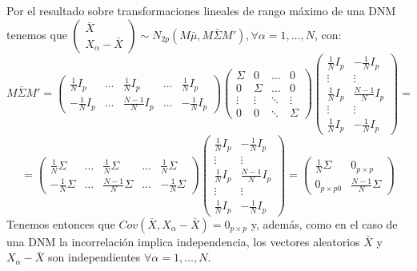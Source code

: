 \documentclass[11pt,a4paper]{article}
\begin{document}
\begin{enumerate}[label=\arabic*.]
\begin{enumerate}[label=(\alph*)]
Por el resultado sobre transformaciones lineales de rango máximo de una DNM tenemos que $\begin{pmatrix} \bar{X} \\ X_{\alpha}-\bar{X} \end{pmatrix} \sim N_{2p}(M\bar{\mu}, M\bar{\Sigma}M'), \forall \alpha = 1, \dots, N$, con:
$$M\bar{\Sigma}M' = \begin{pmatrix}
\frac{1}{N} I_{p} & \dots & \frac{1}{N}I_{p} & \dots & \frac{1}{N}I_{p} \\
-\frac{1}{N}I_{p} & \dots & \frac{N-1}{N}I_{p} & \dots & -\frac{1}{N}I_{p}
\end{pmatrix} \begin{pmatrix}
\Sigma & 0 & \dots & 0 \\
0 & \Sigma & \dots & 0 \\
\vdots & \vdots & \ddots & \vdots \\
0 & 0 & \ddots & \Sigma
\end{pmatrix} \begin{pmatrix}
\frac{1}{N} I_{p} & -\frac{1}{N}I_{p} \\
\vdots & \vdots \\
\frac{1}{N}I_{p} & \frac{N-1}{N}I_{p} \\
\vdots & \vdots \\
\frac{1}{N}I_{p} & -\frac{1}{N}I_{p}
\end{pmatrix} =$$
$$=\begin{pmatrix}
\frac{1}{N}\Sigma & \dots & \frac{1}{N}\Sigma & \dots & \frac{1}{N}\Sigma \\
-\frac{1}{N}\Sigma & \dots & \frac{N-1}{N}\Sigma & \dots & -\frac{1}{N}\Sigma
\end{pmatrix} \begin{pmatrix}
\frac{1}{N} I_{p} & -\frac{1}{N}I_{p} \\
\vdots & \vdots \\
\frac{1}{N}I_{p} & \frac{N-1}{N}I_{p} \\
\vdots & \vdots \\
\frac{1}{N}I_{p} & -\frac{1}{N}I_{p}
\end{pmatrix} = \begin{pmatrix}
\frac{1}{N}\Sigma & 0_{p \times p} \\
0_{p \times p 0} & \frac{N-1}{N}\Sigma
\end{pmatrix}$$
Tenemos entonces que $Cov(\bar{X}, X_{\alpha}-\bar{X}) = 0_{p \times p}$ y, además, como en el caso de una DNM la incorrelación implica independencia, los vectores aleatorios $\bar{X}$ y $X_{\alpha}-\bar{X}$ son independientes $\forall \alpha = 1, \dots, N$.


\end{enumerate}
\end{enumerate}
\end{document}
